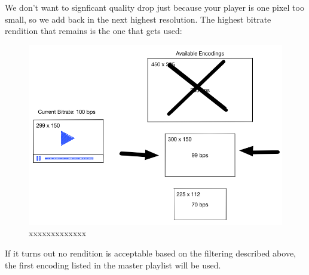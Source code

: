 We don't want to signficant quality drop just because your player is one pixel too small, so we add back in the next highest resolution. The highest bitrate rendition that remains is the one that gets used:


\begin{figure}[htb] %
 \centering
 \includegraphics[width=1.0\linewidth]{images/chapter3/bitrate-switching-4.png}\hfill
 \caption[xxxxxxxxx]{xxxxxxxxxxxxx}
 \label{fig:fourV}
\end{figure}


If it turns out no rendition is acceptable based on the filtering described above, the first encoding listed in the master playlist will be used.


\newpage